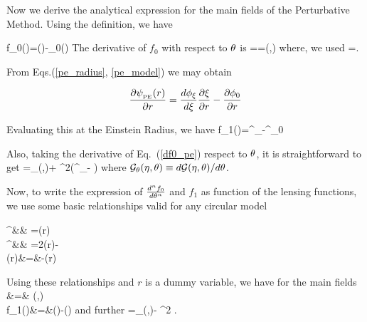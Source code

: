 Now we derive the analytical expression for the main fields of the
Perturbative Method. Using the definition, we have

\beq
f_0(\te)=\phi(\xer)-\phi_0(\re)
\eeq
The derivative of $f_0$ with respect to $\theta$ is
\beq
{}==\dfrac{\phi^\prime_{\xer}}{\xer}\scriptg(\eta,\te)
\label{df0_pe}
\eeq
where, we used 
\beq
{}=\dfrac{\scriptg(\eta,\te)}{\xer}.                 
\label{dxer_pe}
\eeq

From Eqs.{(\ref{pe_radius}, \ref{pe_model})} we may obtain 

\begin{equation*}
\dfrac{\partial \psi_{_{\mathrm{PE}}}(r) }{\partial r}=\dfrac{d\phi_\xi}{d\xi}\dfrac{\partial \xi}{\partial r}-\dfrac{\partial \phi_0}{\partial r}
\end{equation*}

Evaluating this at the Einstein Radius, we have
\beq
f_1(\te)=\dfrac{\xer}{\re}\phi^\prime_{\xer}-\phi^\prime_0
\label{f1_pe}
\eeq

Also, taking the derivative of Eq.~(\ref{df0_pe}) respect to $\theta$, it is straightforward to get
\beq
{}=\scriptg_\te(\eta,\te)\dfrac{\phi^\prime_{\xer}}{\xer}+%
\left[ \dfrac{\scriptg(\eta,\te)}{\xer}\right]^2\left(\phi^{\prime\prime}_{\xer}-\dfrac{\phi^{\prime}_{\xer}}{\xer}  \right)
\label{ddf0_pe}
\eeq
where $\mathcal{G}_\theta(\eta,\theta)\equiv d\mathcal{G}(\eta,\theta)/d\theta$.

Now, to write the expression of $d^nf_0 \over d\theta^n$ and $f_1$ as function of the lensing functions, we use some basic relationships valid for
any circular model

\bea
\phi^\prime &\equiv& =\alpha(r) \label{dphi}\\
\phi^{\prime\prime}&\equiv& =2\kappa(r)-\label{ddphi}\\
\gamma(r)&=&-\kappa(r) \label{shear_gen}
\eea

Using these relationships and $r$ is a dummy variable, we have for the main fields
\bea
{}&=& \dfrac{\alpha(\xer)}{\xer}\scriptg(\eta,\te) \label{df0_pe2}\\
f_1(\te)&=&\dfrac{\xer}{\re}\alpha(\xer)-\alpha(\re) \label{f1_pe2}
\eea
and further
\beq
\label{ddf0_pe2}
=\scriptg_\te(\eta,\te)\dfrac{\alpha(\xer)}{\xer}-%
\left[ \dfrac{\scriptg(\eta,\te)}{\xer}\right]^2 .
\eeq

